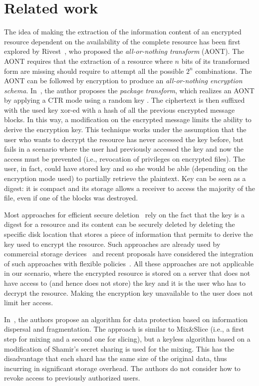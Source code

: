 \section{Related work}\label{ms:sec:relwork}

The idea of making the extraction of the information content of an encrypted resource dependent on the availability of the complete resource has been first explored by Rivest~\cite{r97}, who proposed the {\em all-or-nothing transform} (AONT). The AONT requires that the extraction of a resource where $n$ bits of its transformed form are missing should require to attempt all the possible $2^n$ combinations. The AONT can be followed by encryption to produce an {\em all-or-nothing encryption schema}. In~\cite{r97}, the author proposes the {\em package transform}, which realizes an AONT by applying a CTR mode using a random key \key{}. The ciphertext is then suffixed with the used key \key{} {\sc xor}-ed with a hash of all the previous encrypted message blocks. In this way, a modification on the encrypted message limits the ability to derive the encryption key. This technique works under the assumption that the user who wants to decrypt the resource has never accessed the key before, but fails in a scenario where the user had previously accessed the key and now the access must be prevented (i.e., revocation of privileges on encrypted files). The user, in fact, could have stored key \key{} and so she would be able (depending on the encryption mode used) to partially retrieve the plaintext. Key \key{} can be seen as a digest: it is compact and its storage allows a receiver to access the majority of the file, even if one of the blocks was destroyed.

Most approaches for efficient secure deletion~\cite{chhs13,dw10} rely on the fact that the key is a digest for a resource and its content can be securely deleted by deleting the specific disk location that stores a piece of information that permits to derive the key used to encrypt the resource. Such approaches are already used by commercial storage devices~\cite{standardInd} and recent proposals have considered the integration of such approaches with flexible policies~\cite{chhs13}. All these approaches are not applicable in our scenario, where the encrypted resource is stored on a server that does not have access to (and hence does not store) the key and it is the user who has to decrypt the resource. Making the encryption key unavailable to the user does not limit her access.

In~\cite{DBLP:journals/corr/KapustaMN17}, the authors propose an algorithm for data protection based on information dispersal and fragmentation. The approach is similar to Mix\&Slice (i.e., a first step for mixing and a second one for slicing), but a keyless algorithm based on a modification of Shamir's secret sharing \cite{shamir1979share} is used for the mixing. This has the disadvantage that each shard has the same size of the original data, thus incurring in significant storage overhead. The authors do not consider how to revoke access to previously authorized users.

